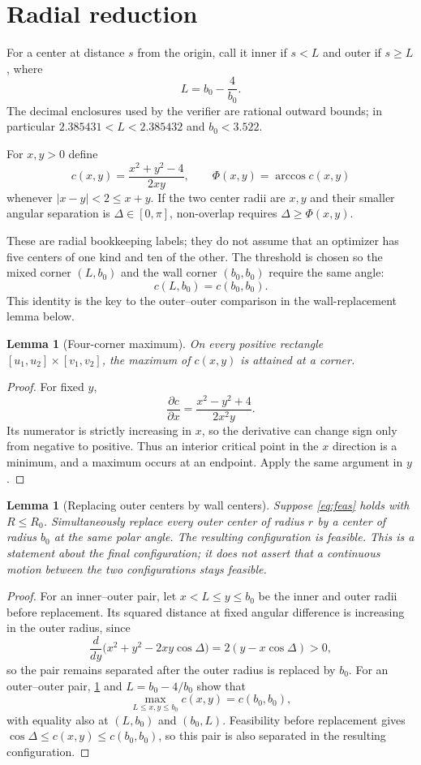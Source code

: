 \documentclass[11pt]{article}
\newtheorem{lemma}[theorem]{Lemma}
\theoremstyle{definition}
\newcommand{\ph}{\Phi}
\begin{document}
\section{Radial reduction}\label{sec:radial}

For a center at distance $s$ from the origin, call it inner if $s<L$ and outer if $s\ge L$, where
\begin{equation}\label{eq:L}
 L=b_0-\frac4{b_0}.
\end{equation}
The decimal enclosures used by the verifier are rational outward bounds; in particular $2.385431<L<2.385432$ and $b_0<3.522$.

For $x,y>0$ define
\[
 c(x,y)=\frac{x^2+y^2-4}{2xy},\qquad \ph(x,y)=\arccos c(x,y)
\]
whenever $|x-y|<2\le x+y$. If the two center radii are $x,y$ and their smaller angular separation is $\Delta\in[0,\pi]$, non-overlap requires $\Delta\ge\ph(x,y)$.

These are radial bookkeeping labels; they do not assume that an optimizer has five centers of one kind and ten of the other. The threshold is chosen so the mixed corner $(L,b_0)$ and the wall corner $(b_0,b_0)$ require the same angle:
\[
 c(L,b_0)=c(b_0,b_0).
\]
This identity is the key to the outer--outer comparison in the wall-replacement lemma below.

\begin{lemma}[Four-corner maximum]\label{lem:corners}
On every positive rectangle $[u_1,u_2]\times[v_1,v_2]$, the maximum of $c(x,y)$ is attained at a corner.
\end{lemma}
\begin{proof}
For fixed $y$,
\[
 \frac{\partial c}{\partial x}=\frac{x^2-y^2+4}{2x^2y}.
\]
Its numerator is strictly increasing in $x$, so the derivative can change sign only from negative to positive. Thus an interior critical point in the $x$ direction is a minimum, and a maximum occurs at an endpoint. Apply the same argument in $y$.
\end{proof}
\begin{lemma}[Replacing outer centers by wall centers]\label{lem:push}
Suppose \eqref{eq:feas} holds with $R\le R_0$. Simultaneously replace every outer center of radius $r$ by a center of radius $b_0$ at the same polar angle. The resulting configuration is feasible. This is a statement about the final configuration; it does not assert that a continuous motion between the two configurations stays feasible.
\end{lemma}
\begin{proof}
For an inner--outer pair, let $x<L\le y\le b_0$ be the inner and outer radii before replacement. Its squared distance at fixed angular difference is increasing in the outer radius, since
\[
 \frac{d}{dy}\bigl(x^2+y^2-2xy\cos\Delta\bigr)=2(y-x\cos\Delta)>0,
\]
so the pair remains separated after the outer radius is replaced by $b_0$. For an outer--outer pair, \cref{lem:corners} and $L=b_0-4/b_0$ show that
\[
\max_{L\le x,y\le b_0}c(x,y)=c(b_0,b_0),
\]
with equality also at $(L,b_0)$ and $(b_0,L)$. Feasibility before replacement gives $\cos\Delta\le c(x,y)\le c(b_0,b_0)$, so this pair is also separated in the resulting configuration.
\end{proof}
\end{document}
